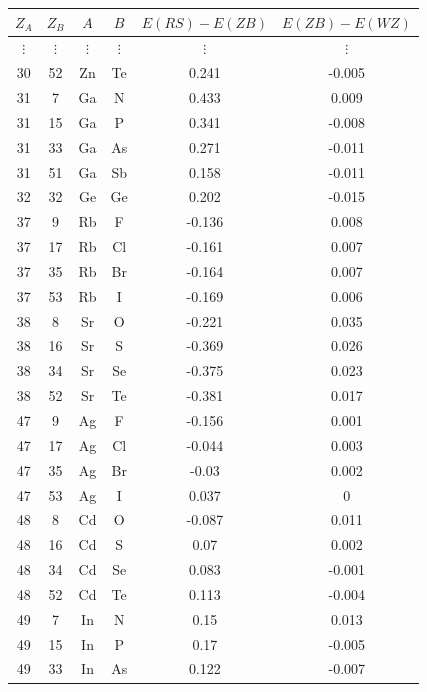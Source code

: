 \documentclass[11pt,oneside,czech,american]{book} %
\theoremstyle{definition} %
\theoremstyle{definition}
\begin{document}
\begin{table}
\begin{minipage}{0.5\textwidth}
	\end{minipage} \hfill
	\begin{minipage}{0.5\textwidth}
		\begin{tabular}{cccccc}
			\toprule
			$Z_A$ &   $Z_B$ & $A$   & $B$   &      $E(RS) - E(ZB)$ &     $E(ZB)-E(WZ)$ \\
			\midrule
			$\vdots$ & $\vdots$ & $\vdots$ & $\vdots$ & $\vdots$ & $\vdots$  \\ 
			30 &    52 & Zn  & Te  &  0.241 & -0.005 \\
			31 &     7 & Ga  & N   &  0.433 &  0.009 \\
			31 &    15 & Ga  & P   &  0.341 & -0.008 \\
			31 &    33 & Ga  & As  &  0.271 & -0.011 \\
			31 &    51 & Ga  & Sb  &  0.158 & -0.011 \\
			32 &    32 & Ge  & Ge  &  0.202 & -0.015 \\
			37 &     9 & Rb  & F   & -0.136 &  0.008 \\
			37 &    17 & Rb  & Cl  & -0.161 &  0.007 \\
			37 &    35 & Rb  & Br  & -0.164 &  0.007 \\
			37 &    53 & Rb  & I   & -0.169 &  0.006 \\
			38 &     8 & Sr  & O   & -0.221 &  0.035 \\
			38 &    16 & Sr  & S   & -0.369 &  0.026 \\
			38 &    34 & Sr  & Se  & -0.375 &  0.023 \\
			38 &    52 & Sr  & Te  & -0.381 &  0.017 \\
			47 &     9 & Ag  & F   & -0.156 &  0.001 \\
			47 &    17 & Ag  & Cl  & -0.044 &  0.003 \\
			47 &    35 & Ag  & Br  & -0.03  &  0.002 \\
			47 &    53 & Ag  & I   &  0.037 &  0     \\
			48 &     8 & Cd  & O   & -0.087 &  0.011 \\
			48 &    16 & Cd  & S   &  0.07  &  0.002 \\
			48 &    34 & Cd  & Se  &  0.083 & -0.001 \\
			48 &    52 & Cd  & Te  &  0.113 & -0.004 \\
			49 &     7 & In  & N   &  0.15  &  0.013 \\
			49 &    15 & In  & P   &  0.17  & -0.005 \\
			49 &    33 & In  & As  &  0.122 & -0.007 \\

\end{tabular}
\end{minipage}
\end{table}
\end{document}
